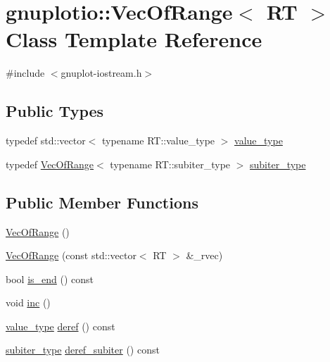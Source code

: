 \hypertarget{classgnuplotio_1_1_vec_of_range}{}\section{gnuplotio\+:\+:Vec\+Of\+Range$<$ RT $>$ Class Template Reference}
\label{classgnuplotio_1_1_vec_of_range}


{\ttfamily \#include $<$gnuplot-\/iostream.\+h$>$}

\subsection*{Public Types}
\begin{DoxyCompactItemize}
\item 
typedef std\+::vector$<$ typename R\+T\+::value\+\_\+type $>$ \hyperlink{classgnuplotio_1_1_vec_of_range_aed503f2f8d8ed71b303f2db26872bafd}{value\+\_\+type}
\item 
typedef \hyperlink{classgnuplotio_1_1_vec_of_range}{Vec\+Of\+Range}$<$ typename R\+T\+::subiter\+\_\+type $>$ \hyperlink{classgnuplotio_1_1_vec_of_range_a4cfae20b9797febceffafec3415b52db}{subiter\+\_\+type}
\end{DoxyCompactItemize}
\subsection*{Public Member Functions}
\begin{DoxyCompactItemize}
\item 
\hyperlink{classgnuplotio_1_1_vec_of_range_a077cf69b9ea96d4f0da78a5e72ab2427}{Vec\+Of\+Range} ()
\item 
\hyperlink{classgnuplotio_1_1_vec_of_range_a81e04f9ab4b8641d69df61f695e97e34}{Vec\+Of\+Range} (const std\+::vector$<$ RT $>$ \&\+\_\+rvec)
\item 
bool \hyperlink{classgnuplotio_1_1_vec_of_range_a714b945004e06909e5a0cdc3cca619b5}{is\+\_\+end} () const
\item 
void \hyperlink{classgnuplotio_1_1_vec_of_range_a2e5371ab6c88994e3fc6f12324783e1c}{inc} ()
\item 
\hyperlink{classgnuplotio_1_1_vec_of_range_aed503f2f8d8ed71b303f2db26872bafd}{value\+\_\+type} \hyperlink{classgnuplotio_1_1_vec_of_range_ab0a35bc07a4f12b18bd1541bc4b771fc}{deref} () const
\item 
\hyperlink{classgnuplotio_1_1_vec_of_range_a4cfae20b9797febceffafec3415b52db}{subiter\+\_\+type} \hyperlink{classgnuplotio_1_1_vec_of_range_a9b02d8bd8ec62ba77de16ad8ea8a87b2}{deref\+\_\+subiter} () const
\end{DoxyCompactItemize}
